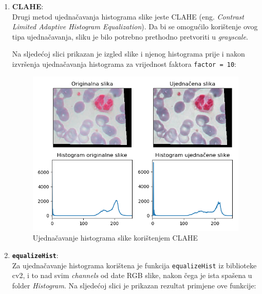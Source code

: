 \documentclass[12pt,a4paper]{article}
\begin{document}
\begin{enumerate}
\begin{figure}[H]
\end{figure}

\newpage

\item \textbf{CLAHE}: \\

Drugi metod ujednačavanja histograma slike jeste CLAHE (eng. \textit{Contrast Limited Adaptive Histogram Equalization}). Da bi se omogućilo korištenje ovog tipa ujednačavanja, sliku je bilo potrebno prethodno pretvoriti u \textit{grayscale}.

Na sljedećoj slici prikazan je izgled slike i njenog histograma prije i nakon izvršenja ujednačavanja histograma za vrijednost faktora \texttt{factor = 10}:

\begin{figure}[H]

\center
\includegraphics[scale=0.9]{s10Histogram2.png}
\caption{Ujednačavanje histograma slike korištenjem CLAHE}
	
\end{figure}

\newpage

\item \textbf{\texttt{equalizeHist}}: \\

Za ujednačavanje histograma korištena je funkcija \texttt{equalizeHist} iz biblioteke cv2, i to nad svim \textit{channels} od date RGB slike, nakon čega je ista spašena u folder \textit{Histogram}. Na sljedećoj slici je prikazan rezultat primjene ove funkcije:

\begin{figure}[H]


\end{figure}
\end{enumerate}
\end{document}
